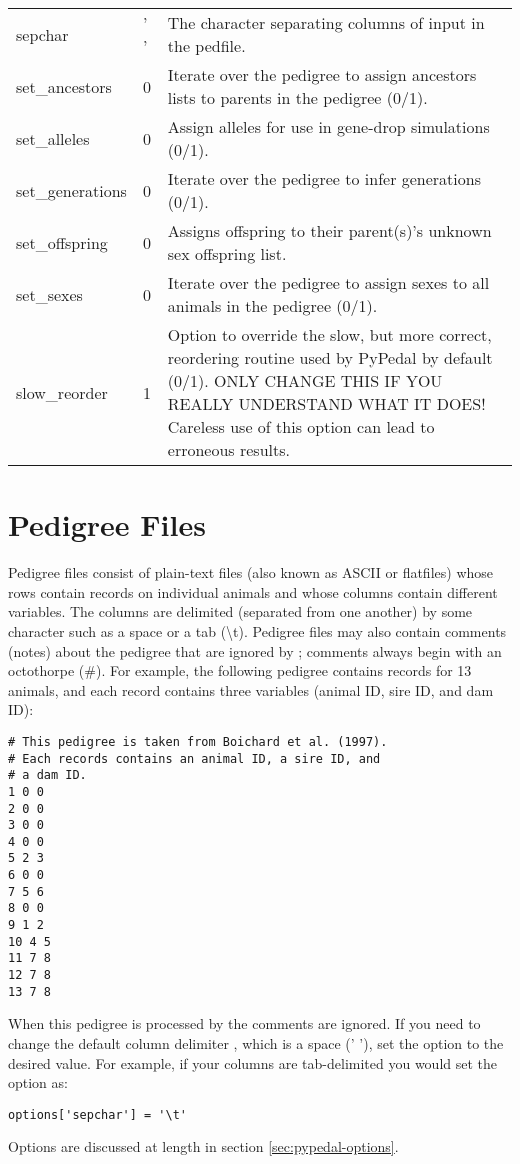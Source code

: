 \begin{center}
\begin{supertabular}{l|l|p{4in}}
    sepchar          & ' '          & The character separating columns of input in the pedfile. \\
    set\_ancestors   & 0            & Iterate over the pedigree to assign ancestors lists to parents in the pedigree (0/1). \\
    set\_alleles     & 0            & Assign alleles for use in gene-drop simulations (0/1). \\
    set\_generations & 0            & Iterate over the pedigree to infer generations (0/1). \\
    set\_offspring   & 0            & Assigns offspring to their parent(s)'s unknown sex offspring list. \\
    set\_sexes       & 0            & Iterate over the pedigree to assign sexes to all animals in the pedigree (0/1). \\
    slow\_reorder    & 1            & Option to override the slow, but more correct, reordering routine used by PyPedal by default (0/1).  ONLY CHANGE THIS IF YOU REALLY UNDERSTAND WHAT IT DOES!  Careless use of this option can lead to erroneous results. \\
    \hline
    \end{supertabular}
\end{center}
\section{Pedigree Files}
\label{sec:pedigree-files}
Pedigree files consist of plain-text files (also known as ASCII or flatfiles) whose rows contain
records on individual animals and whose columns contain different variables.  The columns are
delimited (separated from one another) by some character such as a space or a tab (\textbackslash{}t).  Pedigree
files may also contain comments (notes) about the pedigree that are ignored by \PyPedal{}; comments
always begin with an octothorpe (\#).  For example, the following pedigree contains records for 13
animals, and each record contains three variables (animal ID, sire ID, and dam ID):
\begin{verbatim}
# This pedigree is taken from Boichard et al. (1997).
# Each records contains an animal ID, a sire ID, and
# a dam ID.
1 0 0
2 0 0
3 0 0
4 0 0
5 2 3
6 0 0
7 5 6
8 0 0
9 1 2
10 4 5
11 7 8
12 7 8
13 7 8
\end{verbatim}
When this pedigree is processed by \PyPedal{} the comments are ignored.  If you need to change the
default column delimiter , which is a space (' '), set the  option to the desired
value.  For example, if your columns are tab-delimited you would set the option as:
\begin{verbatim}
options['sepchar'] = '\t'
\end{verbatim}
Options are discussed at length in section \ref{sec:pypedal-options}.
